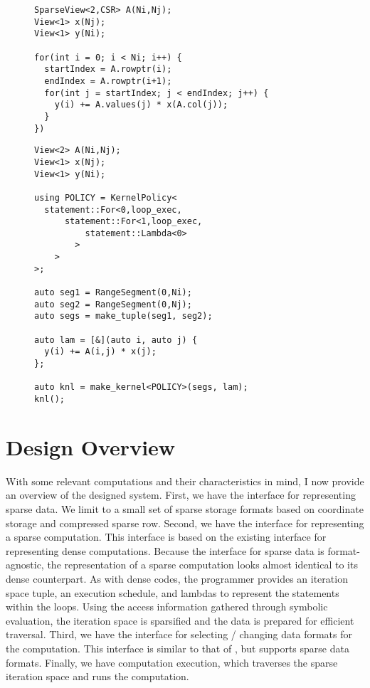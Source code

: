 \begin{figure}
\begin{lstlisting}[caption={C-like implementation of sparse matrix vector multiplication using compressed sparse row (CSR) format.}, label=SparseMV]
SparseView<2,CSR> A(Ni,Nj);
View<1> x(Nj);
View<1> y(Ni);

for(int i = 0; i < Ni; i++) {
  startIndex = A.rowptr(i);
  endIndex = A.rowptr(i+1);
  for(int j = startIndex; j < endIndex; j++) {
    y(i) += A.values(j) * x(A.col(j));
  }
})
\end{lstlisting}
\end{figure}
\begin{figure}
\begin{lstlisting}[caption={RAJA implementation of dense matrix vector multiplication.},label=RAJADenseMV]
View<2> A(Ni,Nj);
View<1> x(Nj);
View<1> y(Ni);

using POLICY = KernelPolicy<
  statement::For<0,loop_exec,
	  statement::For<1,loop_exec,
		  statement::Lambda<0>
		>
	>
>;

auto seg1 = RangeSegment(0,Ni);
auto seg2 = RangeSegment(0,Nj);
auto segs = make_tuple(seg1, seg2);

auto lam = [&](auto i, auto j) {
  y(i) += A(i,j) * x(j);
};

auto knl = make_kernel<POLICY>(segs, lam);
knl();
\end{lstlisting}
\end{figure}


\section{Design Overview}

With some relevant computations and their characteristics in mind, I now provide an overview of the designed system.
First, we have the interface for representing sparse data. 
We limit to a small set of sparse storage formats based on coordinate storage and compressed sparse row.
Second, we have the interface for representing a sparse computation.
This interface is based on the existing interface for representing dense computations.
Because the interface for sparse data is format-agnostic, the representation of a sparse computation looks almost identical to its dense counterpart.
As with dense codes, the programmer provides an iteration space tuple, an execution schedule, and lambdas to represent the statements within the loops.
Using the access information gathered through symbolic evaluation, the iteration space is sparsified and the data is prepared for efficient traversal.
Third, we have the interface for selecting / changing data formats for the computation. 
This interface is similar to that of \FormatDecisions, but supports sparse data formats.
Finally, we have computation execution, which traverses the sparse iteration space and runs the computation. 

